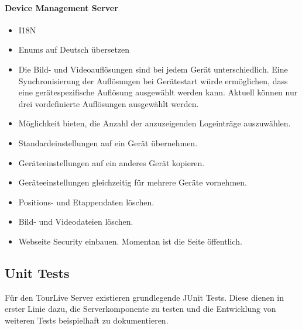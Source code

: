 \paragraph{Device Management Server}
\begin{itemize}
	\item I18N
	\item Enums auf Deutsch übersetzen
	\item Die Bild- und Videoauflösungen sind bei jedem Gerät unterschiedlich. Eine Synchronisierung der Auflösungen bei Gerätestart würde ermöglichen, dass eine gerätespezifische Auflösung ausgewählt werden kann. Aktuell können nur drei vordefinierte Auflösungen ausgewählt werden.
	\item Möglichkeit bieten, die Anzahl der anzuzeigenden Logeinträge auszuwählen.
	\item Standardeinstellungen auf ein Gerät übernehmen.
	\item Geräteeinstellungen auf ein anderes Gerät kopieren. 
	\item Geräteeinstellungen gleichzeitig für mehrere Geräte vornehmen.
	\item Positions- und Etappendaten löschen.
	\item Bild- und Videodateien löschen.
	\item Webseite Security einbauen. Momentan ist die Seite öffentlich.
\end{itemize}

\subsection{Unit Tests}
\label{sec:unittests}
Für den TourLive Server existieren grundlegende JUnit Tests. Diese dienen in erster Linie dazu, die Serverkomponente zu testen und die Entwicklung von weiteren Tests beispielhaft zu dokumentieren.